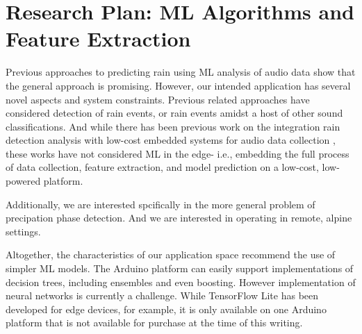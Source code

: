 \section{Research Plan: ML Algorithms and Feature Extraction}

Previous approaches to predicting rain using ML analysis of audio data
show that the general approach is promising. However, our intended
application has several novel aspects and system constraints. Previous
related approaches have considered detection of rain events, or rain
events amidst a host of other sound classifications. And while there
has been previous work on the integration rain detection analysis with
low-cost embedded systems for audio data collection
\cite{Avanzato_Fransesco_et_al.,Guico_et_al.}, these works have not
considered ML in the edge- i.e., embedding the full process of data
collection, feature extraction, and model prediction on a low-cost,
low-powered platform.

Additionally, we are interested spcifically in the more general
problem of precipation phase detection. And we are interested in
operating in remote, alpine settings.

Altogether, the characteristics of our application space recommend
the use of simpler ML models. The Arduino platform can easily support
implementations of decision trees, including ensembles and even
boosting. However implementation of neural networks is currently a
challenge. While TensorFlow Lite has been developed for edge devices,
for example, it is only available on one Arduino platform that is
not available for purchase at the time of this writing. 



